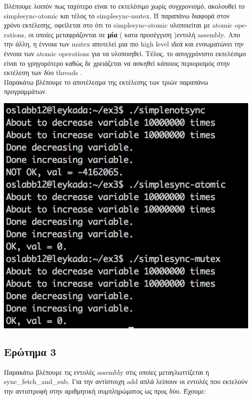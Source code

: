 \documentclass[12pt]{article}
\begin{document}
Βλέπουμε λοιπόν πως ταχύτερο είναι το εκτελέσιμο χωρίς συγχρονισμό, ακολουθεί το \textlatin{simplesync-atomic} και τέλος το \textlatin{simplesync-mutex}.
Η παραπάνω διαφορά στον χρόνο εκτέλεσης, οφείλεται στο ότι το \textlatin{simplesync-atomic} υλοποιείται με \textlatin{atomic operations}, οι οποίες μεταφράζονται σε \textbf{μία} ( κατα προσέγγιση )εντολή \textlatin{assembly}. Απο την άλλη, η έννοια των \textlatin{mutex} αποτελεί μια πιο \textlatin{high level} ιδεά και ενσωματώνει την έννοια των \textlatin{atomic operations} για να υλοποιηθεί. Τέλος, το ασυγχρόνιστο εκτελέσιμο είναι το γρηγορότερο καθώς δε χρειάζεται να ασκηθεί κάποιος περιορισμός στην εκτέλεση των δύο \textlatin{threads} . \\

Παρακάτω βλέπουμε το αποτέλεσμα της εκτέλεσης των τριών παραπάνω προγραμμάτων.


\includegraphics[scale=0.5]{ask3-sync.png}

\subsection*{Ερώτημα 3}
Παρακάτω βλέπουμε τις εντολές \textlatin{assembly} στις οποίες μεταγλωττίζεται η \textlatin{sync\_fetch\_and\_sub}. Για την αντίστοιχη \textlatin{add} απλά λείπουν οι εντολές που εκτελούν την αντιστροφή στην αριθμητική συμπληρώματος ως προς δύο. Έχουμε:\\ 
\end{document}
